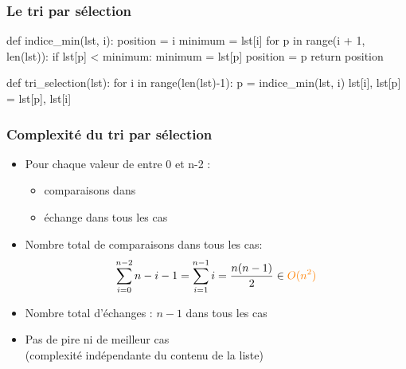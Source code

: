 \documentclass[12pt]{linfo-beamer}
\begin{document}


\begin{frame}[fragile]
 \frametitle{Le tri par sélection}

\begin{pyframe}{}
def indice_min(lst, i):
    position = i
    minimum = lst[i]
    for p in range(i + 1, len(lst)):
        if lst[p] < minimum:
            minimum = lst[p]
            position = p
    return position
\end{pyframe}

\begin{pyframe}{}
def tri_selection(lst):
    for i in range(len(lst)-1):
        p = indice_min(lst, i)
        lst[i], lst[p] = lst[p], lst[i]
\end{pyframe}

\end{frame}


\begin{frame}
  \frametitle{Complexité du tri par sélection}

  \begin{itemize}
  \item Pour chaque valeur de  entre 0 et n-2 :
    \begin{itemize}
    \item {} comparaisons dans 
    \item  {} échange dans tous les cas
    \end{itemize}
  \item Nombre total de comparaisons dans tous les cas:
    \[
    \sum_{i=0}^{n-2} n-i-1 = \sum_{i=1}^{n-1} i = \frac{n(n-1)}{2} \in {\color{orange} O(n^2)}
    \]
  \item Nombre total d'échanges : $n-1$ dans tous les cas

  \item Pas de pire ni de meilleur cas\\(complexité indépendante du
    contenu de la liste)
  \end{itemize}
\end{frame}
\end{document}
